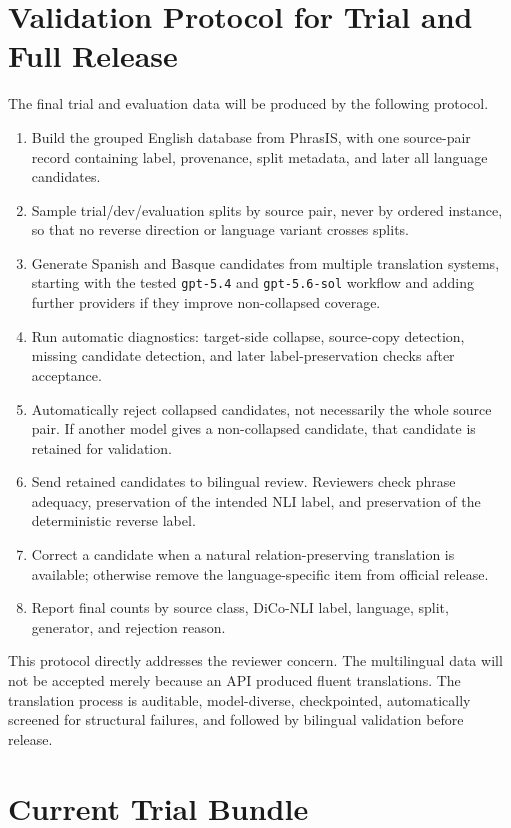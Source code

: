 \documentclass[10pt]{article}
\begin{document}
\section{Validation Protocol for Trial and Full Release}

The final trial and evaluation data will be produced by the following protocol.

\begin{enumerate}
\item Build the grouped English database from PhrasIS, with one source-pair
record containing label, provenance, split metadata, and later all language
candidates.
\item Sample trial/dev/evaluation splits by source pair, never by ordered
instance, so that no reverse direction or language variant crosses splits.
\item Generate Spanish and Basque candidates from multiple translation systems,
starting with the tested \texttt{gpt-5.4} and \texttt{gpt-5.6-sol} workflow and
adding further providers if they improve non-collapsed coverage.
\item Run automatic diagnostics: target-side collapse, source-copy detection,
missing candidate detection, and later label-preservation checks after
acceptance.
\item Automatically reject collapsed candidates, not necessarily the whole
source pair.  If another model gives a non-collapsed candidate, that candidate
is retained for validation.
\item Send retained candidates to bilingual review.  Reviewers check phrase
adequacy, preservation of the intended NLI label, and preservation of the
deterministic reverse label.
\item Correct a candidate when a natural relation-preserving translation is
available; otherwise remove the language-specific item from official release.
\item Report final counts by source class, DiCo-NLI label, language, split,
generator, and rejection reason.
\end{enumerate}

This protocol directly addresses the reviewer concern.  The multilingual data
will not be accepted merely because an API produced fluent translations.  The
translation process is auditable, model-diverse, checkpointed, automatically
screened for structural failures, and followed by bilingual validation before
release.

\section{Current Trial Bundle}
\end{document}
